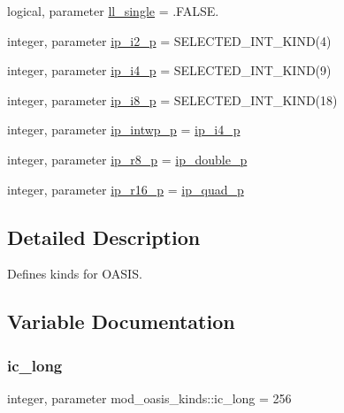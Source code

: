 \begin{DoxyCompactItemize}
\item 
logical, parameter \hyperlink{namespacemod__oasis__kinds_ae462c851305d5fe6ef6178c9dcac4468}{ll\+\_\+single} = .F\+A\+L\+S\+E.
\item 
integer, parameter \hyperlink{namespacemod__oasis__kinds_a27d396cfa521ce47479118dee466eb3c}{ip\+\_\+i2\+\_\+p} = S\+E\+L\+E\+C\+T\+E\+D\+\_\+\+I\+N\+T\+\_\+\+K\+I\+ND(4)
\item 
integer, parameter \hyperlink{namespacemod__oasis__kinds_a1e3c90ad6857ff8675d3e2548d516200}{ip\+\_\+i4\+\_\+p} = S\+E\+L\+E\+C\+T\+E\+D\+\_\+\+I\+N\+T\+\_\+\+K\+I\+ND(9)
\item 
integer, parameter \hyperlink{namespacemod__oasis__kinds_a8dbd6aa926433f02df94bca462f122df}{ip\+\_\+i8\+\_\+p} = S\+E\+L\+E\+C\+T\+E\+D\+\_\+\+I\+N\+T\+\_\+\+K\+I\+ND(18)
\item 
integer, parameter \hyperlink{namespacemod__oasis__kinds_a7bf99d9ca4dbcaa5e6207e48835d2ca2}{ip\+\_\+intwp\+\_\+p} = \hyperlink{namespacemod__oasis__kinds_a1e3c90ad6857ff8675d3e2548d516200}{ip\+\_\+i4\+\_\+p}
\item 
integer, parameter \hyperlink{namespacemod__oasis__kinds_a6129e979d32b55cb020fb76068ce9808}{ip\+\_\+r8\+\_\+p} = \hyperlink{namespacemod__oasis__kinds_aff0b6e4604e7a60178eeca47edec1460}{ip\+\_\+double\+\_\+p}
\item 
integer, parameter \hyperlink{namespacemod__oasis__kinds_a865ff1d43dba43a1ff14004e28d51542}{ip\+\_\+r16\+\_\+p} = \hyperlink{namespacemod__oasis__kinds_a7889b0425dd055cdc74af6ba9fa1354c}{ip\+\_\+quad\+\_\+p}
\end{DoxyCompactItemize}


\subsection{Detailed Description}
Defines kinds for O\+A\+S\+IS. 

\subsection{Variable Documentation}
\mbox{\label{namespacemod__oasis__kinds_ada2568a43f71f0f93c054cfd3982da57}} 
\subsubsection{\texorpdfstring{ic\+\_\+long}{ic\_long}}
{\footnotesize\ttfamily integer, parameter mod\+\_\+oasis\+\_\+kinds\+::ic\+\_\+long = 256}




